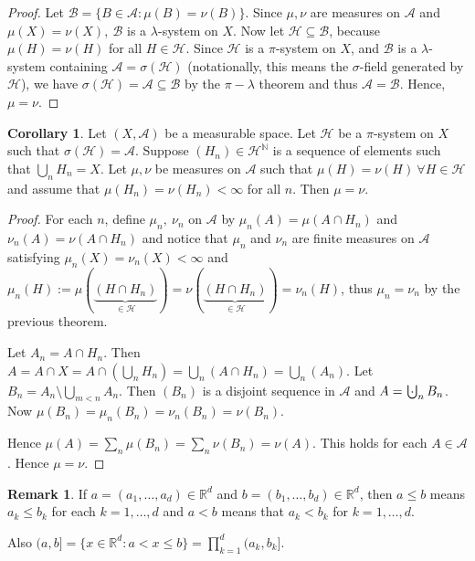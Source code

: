 \documentclass{article}
\newcommand{\R}{\mathbb{R}}
\newcommand{\N}{\mathbb{N}}
\newcommand{\bigcupdot}{\mathop{\mathchoice{\hspace{0.45em}}{\hspace{0.35em}}{}{}\cdot\mathchoice{\hspace{-0.85em}}{\hspace{-0.725em}}{}{}\bigcup\limits}}
\theoremstyle{definition}
\newtheorem{corollary}[theorem]{Corollary}
\newtheorem*{remark}{Remark}
\begin{document}
\begin{proof}
    Let $\mathscr{B} = \{B \in \mathscr{A} : \mu(B) = \nu(B)\}$. Since $\mu,\nu$ are measures on $\mathscr{A}$ and $\mu(X) = \nu(X),\ \mathscr{B}$ is a $\lambda$-system on $X$. Now let $\mathscr{H} \subseteq \mathscr{B}$, because $\mu(H) = \nu(H)$ for all $H \in \mathscr{H}$. Since $\mathscr{H}$ is a $\pi$-system on $X$, and $\mathscr{B}$ is a $\lambda$-system containing $\mathscr{A} = \sigma(\mathscr{H})$ (notationally, this means the $\sigma$-field generated by $\mathscr{H}$), we have $\sigma(\mathscr{H}) = \mathscr{A} \subseteq \mathscr{B}$ by the $\pi-\lambda$ theorem and thus $\mathscr{A} = \mathscr{B}$. Hence, $\mu = \nu$.
\end{proof}

\begin{corollary}
    Let $(X,\mathscr{A})$ be a measurable space. Let $\mathscr{H}$ be a $\pi$-system on $X$ such that $\sigma(\mathscr{H}) = \mathscr{A}$. Suppose $(H_n) \in \mathscr{H}^{\N}$ is a sequence of elements such that $\bigcup_n H_n = X$. Let $\mu,\nu$ be measures on $\mathscr{A}$ such that $\mu(H) = \nu(H)\ \forall H \in \mathscr{H}$ and assume that $\mu(H_n) = \nu(H_n) < \infty$ for all $n$. Then $\mu = \nu$.
\end{corollary}

\begin{proof}
    For each $n$, define $\mu_n,\ \nu_n$ on $\mathscr{A}$ by $\mu_n (A) = \mu(A \cap H_n)$ and $\nu_n (A) = \nu(A \cap H_n)$ and notice that $\mu_n$ and $\nu_n$ are finite measures on $\mathscr{A}$ satisfying $\mu_n (X) = \nu_n (X) < \infty$ and $\mu_n (H) := \mu (\underbrace{(H \cap H_n)}_{\in \mathscr{H}}) = \nu(\underbrace{(H \cap H_n)}_{\in \mathscr{H}}) = \nu_n (H)$, thus $\mu_n = \nu_n$ by the previous theorem.
    
    Let $A_n = A \cap H_n$. Then $A = A \cap X = A \cap (\bigcup_n H_n) = \bigcup_n (A \cap H_n) = \bigcup_n(A_n)$.
    Let $B_n = A_n \setminus \bigcup_{m < n} A_n$. Then $(B_n)$ is a disjoint sequence in $\mathscr{A}$ and $A = \bigcupdot_n B_n$.
    Now $\mu(B_n) = \mu_n(B_n) = \nu_n(B_n) = \nu(B_n)$.
    
    Hence $\mu(A) = \sum_n \mu(B_n) = \sum_n \nu(B_n) = \nu(A)$. This holds for each $A \in \mathscr{A}$. Hence $\mu = \nu$.
\end{proof}

\begin{remark}
    If $a = (a_1, \ldots, a_d) \in \R^d$ and $b = (b_1, \ldots, b_d) \in \R^d$, then $a \leq b$ means $a_k \leq b_k$ for each $k = 1, \ldots, d$ and $a < b$ means that $a_k < b_k$ for $k = 1, \ldots, d$.
    
    Also $(a, b] = \{x \in \R^d : a < x \leq b\} = \prod_{k=1}^d (a_k, b_k]$.
\end{remark}
\end{document}
